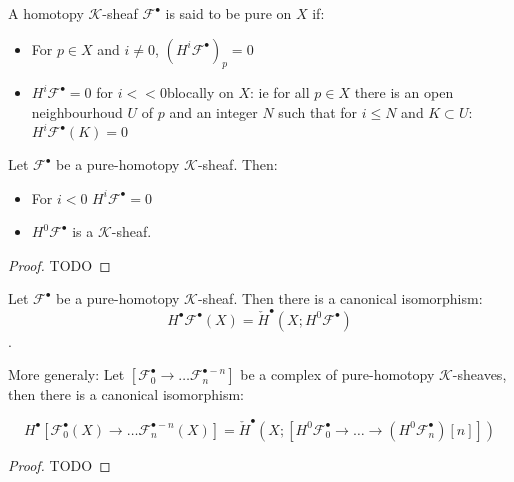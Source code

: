 

\begin{definition}\label{def:pure_homotopy_k_sheaf}
    A homotopy $\mathcal{K}$-sheaf $\mathcal{F}^{\bullet}$ is said to be pure on $X$ if: \begin{itemize}
        \item For $p\in X$ and $i\neq 0$, $(H^i\mathcal{F}^{\bullet})_p=0$
        \item $H^i\mathcal{F}^{\bullet}=0$ for $i<<0$blocally on $X$: ie for all $p\in X$ there is an open neighbourhoud $U$ of $p$ and an integer $N$ such that for $i\leq N$ and $K\subset U$: $H^i\mathcal{F}^{\bullet}(K)=0$
    \end{itemize}
\end{definition}

\begin{lemma}\label{lem:csq_of_pure_homotopy_k_sheaf}
    Let $\mathcal{F}^{\bullet}$ be a pure-homotopy $\mathcal{K}$-sheaf. Then: \begin{itemize}
        \item For $i<0$ $H^i\mathcal{F}^{\bullet}=0$
        \item $H^0\mathcal{F}^{\bullet}$ is a $\mathcal{K}$-sheaf.
    \end{itemize}
\end{lemma}

\begin{proof}
    TODO
\end{proof}

\begin{proposition}\label{prop:cech_of_pure_homotopy_k_sheaf}
    Let $\mathcal{F}^{\bullet}$ be a pure-homotopy $\mathcal{K}$-sheaf. Then there is a canonical isomorphism:
    \[H^{\bullet}\mathcal{F}^{\bullet}(X)=\check{H}^{\bullet}(X;H^0\mathcal{F}^{\bullet})\].

    More generaly: Let $[\mathcal{F}_0^{\bullet}\to \ldots\mathcal{F}_n^{\bullet-n}]$  be a complex of pure-homotopy $\mathcal{K}$-sheaves, then there is a canonical isomorphism:

    \[H^{\bullet}[\mathcal{F}_0^{\bullet}(X)\to \ldots\mathcal{F}_n^{\bullet-n}(X)]=\check{H}^{\bullet}(X;[H^0\mathcal{F}_0^{\bullet}\to\ldots\to (H^0\mathcal{F}_n^{\bullet})[n]])\]
\end{proposition}

\begin{proof}
    TODO
\end{proof}